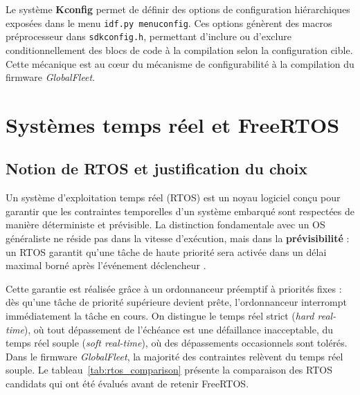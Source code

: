 Le système \textbf{Kconfig} permet de définir des options de
configuration hiérarchiques exposées dans le menu \texttt{idf.py
menuconfig}. Ces options génèrent des macros préprocesseur dans
\texttt{sdkconfig.h}, permettant d'inclure ou d'exclure
conditionnellement des blocs de code à la compilation selon la
configuration cible. Cette mécanique est au cœur du mécanisme de
configurabilité à la compilation du firmware \textit{GlobalFleet}.

\section{Systèmes temps réel et FreeRTOS}
\label{sec:freertos}

\subsection{Notion de RTOS et justification du choix}
\label{subsec:rtos}

Un système d'exploitation temps réel (RTOS) est un noyau logiciel
conçu pour garantir que les contraintes temporelles d'un système
embarqué sont respectées de manière déterministe et prévisible.
La distinction fondamentale avec un OS généraliste ne réside pas dans
la vitesse d'exécution, mais dans la \textbf{prévisibilité} : un RTOS
garantit qu'une tâche de haute priorité sera activée dans un délai
maximal borné après l'événement déclencheur \cite{freertos_official}.

Cette garantie est réalisée grâce à un ordonnanceur préemptif à
priorités fixes : dès qu'une tâche de priorité supérieure devient
prête, l'ordonnanceur interrompt immédiatement la tâche en cours.
On distingue le temps réel strict (\textit{hard real-time}), où tout
dépassement de l'échéance est une défaillance inacceptable, du temps
réel souple (\textit{soft real-time}), où des dépassements
occasionnels sont tolérés. Dans le firmware \textit{GlobalFleet},
la majorité des contraintes relèvent du temps réel souple.
\newpage
Le tableau~\ref{tab:rtos_comparison} présente la comparaison des
RTOS candidats qui ont été évalués avant de retenir FreeRTOS.

